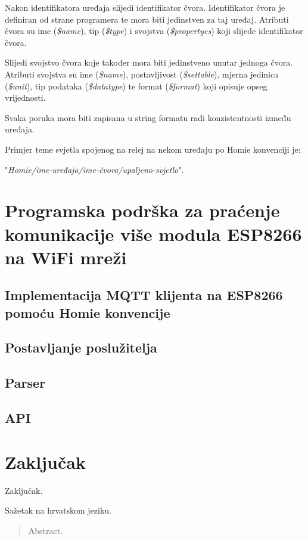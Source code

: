 \documentclass[times, utf8, zavrsni]{fer}
\begin{document}
Nakon identifikatora uređaja slijedi identifikator čvora.
Identifikator čvora je definiran od strane programera te mora biti jedinstven za taj uređaj.
Atributi čvora su ime (\textit{\$name}), tip (\textit{\$type}) i svojstva (\textit{\$propertyes}) koji slijede identifikator čvora.

Slijedi svojstvo čvora koje također mora biti jedinstveno unutar jednoga čvora.
Atributi svojstva su ime (\textit{\$name}), postavljivost (\textit{\$settable}), mjerna jedinica (\textit{\$unit}), tip podataka (\textit{\$datatype}) te format (\textit{\$format}) koji opisuje opseg vrijednosti.

Svaka poruka mora biti zapisana u string formatu radi konzistentnosti između uređaja.

Primjer teme svjetla spojenog na relej na nekom uređaju po Homie konvenciji je:

"\textit{Homie/ime-uređaja/ime-čvora/upaljeno-svjetlo}".

\chapter{Programska podrška za praćenje komunikacije više modula ESP8266 na WiFi mreži}
\section{Implementacija MQTT klijenta na ESP8266 pomoću Homie konvencije}
\section{Postavljanje poslužitelja}
\section{Parser}
\section{API}

\chapter{Zaključak}
Zaključak.




\begin{sazetak}
Sažetak na hrvatskom jeziku.

\end{sazetak}

\begin{abstract}
Abstract.

\end{abstract}
\end{document}
